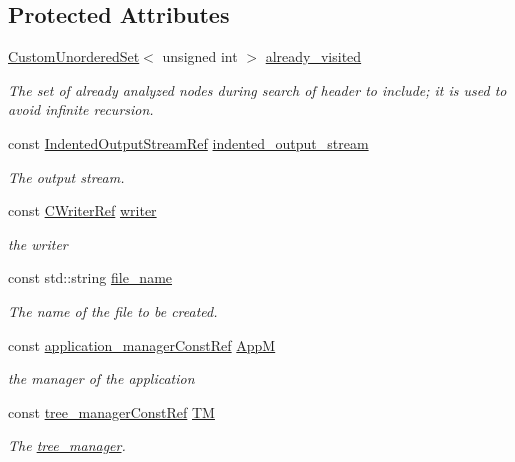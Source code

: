 \subsection*{Protected Attributes}
\begin{DoxyCompactItemize}
\item 
\hyperlink{classCustomUnorderedSet}{Custom\+Unordered\+Set}$<$ unsigned int $>$ \hyperlink{classCBackend_ab4058b823fc1c0cef4183ce282dcad79}{already\+\_\+visited}
\begin{DoxyCompactList}\small\item\em The set of already analyzed nodes during search of header to include; it is used to avoid infinite recursion. \end{DoxyCompactList}\item 
const \hyperlink{indented__output__stream_8hpp_ab32278e11151ef292759c88e99b77feb}{Indented\+Output\+Stream\+Ref} \hyperlink{classCBackend_a80c09865e76c594c3ad883da02d87abc}{indented\+\_\+output\+\_\+stream}
\begin{DoxyCompactList}\small\item\em The output stream. \end{DoxyCompactList}\item 
const \hyperlink{c__writer_8hpp_a4e9c4dfe17e35f981e27b6dd97f9632c}{C\+Writer\+Ref} \hyperlink{classCBackend_a8ebae22824a6201f7cc467ad69b4450a}{writer}
\begin{DoxyCompactList}\small\item\em the writer \end{DoxyCompactList}\item 
const std\+::string \hyperlink{classCBackend_a11ed652bd65b639d749423ff23867161}{file\+\_\+name}
\begin{DoxyCompactList}\small\item\em The name of the file to be created. \end{DoxyCompactList}\item 
const \hyperlink{application__manager_8hpp_abb985163a2a3fb747f6f03b1eaadbb44}{application\+\_\+manager\+Const\+Ref} \hyperlink{classCBackend_ae615cda6d03bdb848968b1eb1e79c273}{AppM}
\begin{DoxyCompactList}\small\item\em the manager of the application \end{DoxyCompactList}\item 
const \hyperlink{tree__manager_8hpp_a792e3f1f892d7d997a8d8a4a12e39346}{tree\+\_\+manager\+Const\+Ref} \hyperlink{classCBackend_a0323ee15f4a2e60c99c730caa2960b5b}{TM}
\begin{DoxyCompactList}\small\item\em The \hyperlink{classtree__manager}{tree\+\_\+manager}. \end{DoxyCompactList}\end{DoxyCompactItemize}
